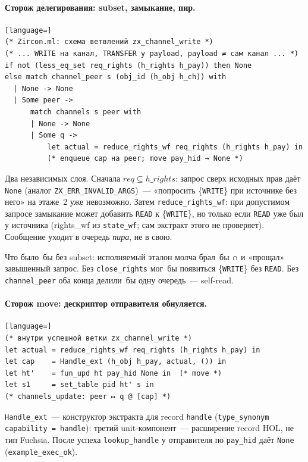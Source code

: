 \documentclass[11pt,a4paper]{article}
\newcommand{\isabel}[1]{{\isabelleit #1}}
\newcommand{\lemmaname}[1]{\isabel{#1}}
\begin{document}
\paragraph{Сторож делегирования: subset, замыкание, пир.}
\begin{lstlisting}[language=]
(* Zircon.ml: схема ветвлений zx_channel_write *)
(* ... WRITE на канал, TRANSFER у payload, payload ≠ сам канал ... *)
if not (less_eq_set req_rights (h_rights h_pay)) then None
else match channel_peer s (obj_id (h_obj h_ch)) with
  | None -> None
  | Some peer ->
      match channels s peer with
      | None -> None
      | Some q ->
          let actual = reduce_rights_wf req_rights (h_rights h_pay) in
          (* enqueue cap на peer; move pay_hid → None *)
\end{lstlisting}
Два независимых слоя. Сначала $\mathit{req}\subseteq h\_rights$:
запрос сверх исходных прав даёт \texttt{None} (аналог
\texttt{ZX\_ERR\_INVALID\_ARGS})~--- «попросить \{\texttt{WRITE}\} при
источнике без него» на этаже~2 уже невозможно. Затем
\texttt{reduce\_rights\_wf}: при допустимом запросе замыкание может
добавить \texttt{READ} к \{\texttt{WRITE}\}, но только если
\texttt{READ} уже был у источника (\lemmaname{rights\_wf} из
\texttt{state\_wf}; сам экстракт этого не проверяет). Сообщение
уходит в очередь \emph{пира}, не в свою.

Что было~бы без subset: исполняемый эталон молча брал~бы ∩ и
«прощал» завышенный запрос. Без \texttt{close\_rights} мог~бы
появиться \{\texttt{WRITE}\} без \texttt{READ}. Без
\texttt{channel\_peer} оба конца делили~бы одну очередь~--- self-read.

\paragraph{Сторож move: дескриптор отправителя обнуляется.}
\begin{lstlisting}[language=]
(* внутри успешной ветки zx_channel_write *)
let actual = reduce_rights_wf req_rights (h_rights h_pay) in
let cap    = Handle_ext (h_obj h_pay, actual, ()) in
let ht'    = fun_upd ht pay_hid None in  (* move *)
let s1     = set_table pid ht' s in
(* channels_update: peer ↦ q @ [cap] *)
\end{lstlisting}
\texttt{Handle\_ext}~--- конструктор экстракта для record
\texttt{handle} (\texttt{type\_synonym capability = handle}): третий
unit-компонент~--- расширение record HOL, не тип Fuchsia.
После успеха \texttt{lookup\_handle} у отправителя по
\texttt{pay\_hid} даёт \texttt{None} (\texttt{example\_exec\_ok}).
\end{document}
